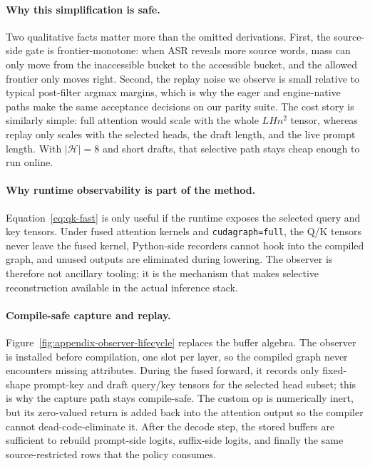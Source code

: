 \documentclass[11pt]{article}
\begin{document}
\paragraph{Why this simplification is safe.}
Two qualitative facts matter more than the omitted derivations. First, the
source-side gate is frontier-monotone: when ASR reveals more source words, mass
can only move from the inaccessible bucket to the accessible bucket, and the
allowed frontier only moves right. Second, the replay noise we observe is small
relative to typical post-filter argmax margins, which is why the eager and
engine-native paths make the same acceptance decisions on our parity suite.
The cost story is similarly simple: full attention would scale with the whole
$LHn^2$ tensor, whereas replay only scales with the selected heads, the draft
length, and the live prompt length. With $|\mathcal{H}|{=}8$ and short drafts,
that selective path stays cheap enough to run online.

\paragraph{Why runtime observability is part of the method.}
Equation~\eqref{eq:qk-fast} is only useful if the runtime exposes the selected
query and key tensors. Under fused attention kernels and
\texttt{cudagraph=full}, the Q/K tensors never leave the fused kernel,
Python-side recorders cannot hook into the compiled graph, and unused outputs
are eliminated during lowering. The observer is therefore not ancillary
tooling; it is the mechanism that makes selective reconstruction available in
the actual inference stack.



\paragraph{Compile-safe capture and replay.}
Figure~\ref{fig:appendix-observer-lifecycle} replaces the buffer algebra. The
observer is installed before compilation, one slot per layer, so the compiled
graph never encounters missing attributes. During the fused forward, it records
only fixed-shape prompt-key and draft query/key tensors for the selected head
subset; this is why the capture path stays compile-safe. The custom op is
numerically inert, but its zero-valued return is added back into the attention
output so the compiler cannot dead-code-eliminate it. After the decode step,
the stored buffers are sufficient to rebuild prompt-side logits, suffix-side
logits, and finally the same source-restricted rows that the policy consumes.
\end{document}
